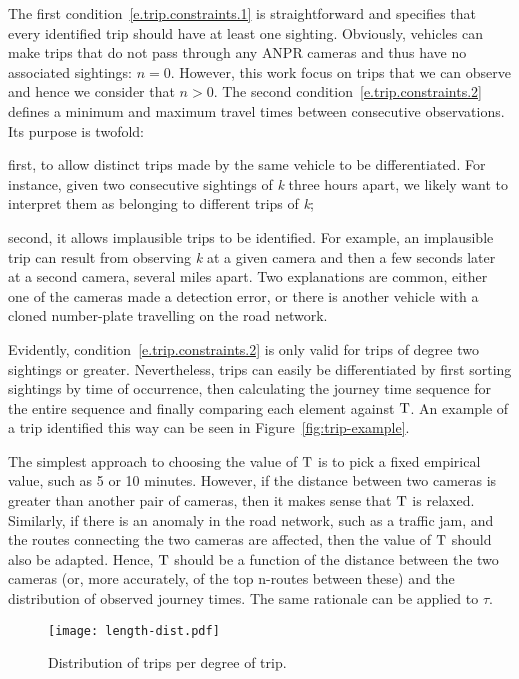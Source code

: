 The first condition~\ref{e.trip.constraints.1} is straightforward and specifies that every identified trip should have at least one sighting. Obviously, vehicles can make trips that do not pass through any ANPR cameras and thus have no associated sightings: $n = 0$. However, this work focus on trips that we can observe and hence we consider that $n > 0$. The second condition~\ref{e.trip.constraints.2} defines a minimum and maximum travel times between consecutive observations. Its purpose is twofold:
\begin{enumerate*}[label=(\roman*)]
  \item first, to allow distinct trips made by the same vehicle to be differentiated. For instance, given two consecutive sightings of \emph{k} three hours apart, we likely want to interpret them as belonging to different trips of \emph{k};
  \item second, it allows implausible trips to be identified. For example, an implausible trip can result from observing \emph{k} at a given camera and then a few seconds later at a second camera, several miles apart. Two explanations are common, either one of the cameras made a detection error, or there is another vehicle with a cloned number-plate travelling on the road network.
\end{enumerate*} Evidently, condition~\ref{e.trip.constraints.2} is only valid for trips of degree two sightings or greater. Nevertheless, trips can easily be differentiated by first sorting sightings by time of occurrence, then calculating the journey time sequence for the entire sequence and finally comparing each element against $\mathrm{T}$. An example of a trip identified this way can be seen in Figure~\ref{fig:trip-example}.

The simplest approach to choosing the value of $\mathrm{T}$ is to pick a fixed empirical value, such as 5 or 10 minutes. However, if the distance between two cameras is greater than another pair of cameras, then it makes sense that $\mathrm{T}$ is relaxed. Similarly, if there is an anomaly in the road network, such as a traffic jam, and the routes connecting the two cameras are affected, then the value of $\mathrm{T}$ should also be adapted. Hence, $\mathrm{T}$ should be a function of the distance between the two cameras (or, more accurately, of the top n-routes between these) and the distribution of observed journey times. The same rationale can be applied to $\tau$.

\begin{figure}[t]
  \centering
  \texttt{[image: length-dist.pdf]}
  \caption{Distribution of trips per degree of trip.}
  \label{fig:length-dist}
\end{figure}

